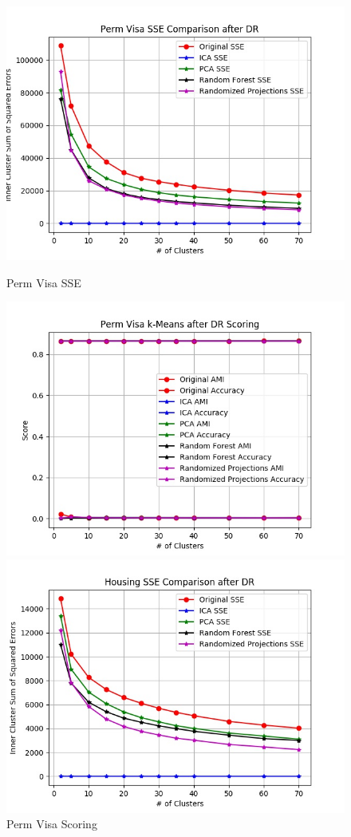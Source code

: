 \documentclass[h]{article}
\begin{document}
 \begin{figure}[H]
      \includegraphics[width=1\textwidth,keepaspectratio]{perm_visa_sse_comparison_after_dr.jpg} 
      \caption*{Perm Visa SSE} 
   \endminipage\hfill
      \includegraphics[width=1\textwidth,keepaspectratio]{perm_visa_k-means_after_dr_scoring.jpg} 
      \caption*{Perm Visa Scoring} 
   \endminipage\hfill
      \includegraphics[width=1\textwidth,keepaspectratio]{housing_sse_comparison_after_dr.jpg} 

\end{figure}
\end{document}
